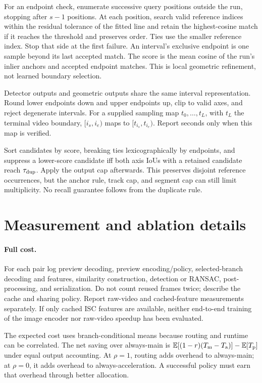 \documentclass[10pt,twocolumn,letterpaper]{article}
\begin{document}
For an endpoint check, enumerate successive query positions outside the run, stopping after
$s-1$ positions. At each position, search valid reference indices within the residual
tolerance of the fitted line and retain the highest-cosine match if it reaches the threshold
and preserves order. Ties use the smaller reference index. Stop that side at the first
failure. An interval's exclusive endpoint is one sample beyond its last accepted match.
The score is the mean cosine of the run's inlier anchors and accepted endpoint matches.
This is local geometric refinement, not learned boundary selection.

Detector outputs and geometric outputs share the same interval representation. Round lower
endpoints down and upper endpoints up, clip to valid axes, and reject degenerate intervals.
For a supplied sampling map $t_0,\ldots,t_L$, with $t_L$ the terminal video boundary,
$[i_s,i_e)$ maps to $[t_{i_s},t_{i_e})$. Report seconds only when this map is verified.

Sort candidates by score, breaking ties lexicographically by endpoints, and suppress a
lower-score candidate iff both axis IoUs with a retained candidate reach $\tau_{\rm dup}$.
Apply the output cap afterwards. This preserves disjoint reference occurrences, but the
anchor rule, track cap, and segment cap can still limit multiplicity. No recall guarantee
follows from the duplicate rule.

\section{Measurement and ablation details}
\paragraph{Full cost.}
For each pair log preview decoding, preview encoding/policy, selected-branch decoding and
features, similarity construction, detection or RANSAC, post-processing, and serialization.
Do not count reused frames twice; describe the cache and sharing policy. Report raw-video
and cached-feature measurements separately. If only cached ISC features are available,
neither end-to-end training of the image encoder nor raw-video speedup has been evaluated.

The expected cost uses branch-conditional means because routing and runtime can be correlated.
The net saving over always-main is
$\mathbb E[(1-r)(T_{\rm m}-T_{\rm a})]-\mathbb E[T_{\rm p}]$ under equal output accounting.
At $\rho=1$, routing adds overhead to always-main; at $\rho=0$, it adds overhead to
always-acceleration. A successful policy must earn that overhead through better allocation.
\end{document}
